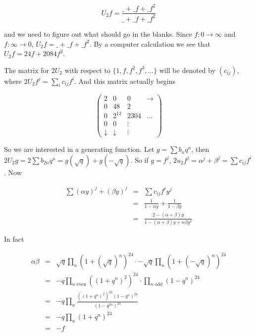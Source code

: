 \documentclass[12pt]{article}
\begin{document}
\[ U_{2}f = \frac{\_ + \_ f + \_ f^{2}}{\_ + \_ f + \_ f^{2}} \]

\noindent and we need to figure out what should go in the blanks.  Since $f:
0 \rightarrow \infty$ and $f: \infty \rightarrow 0$, $U_{2}f = \_ + \_ f +
\_ f^{2}$.  By a computer calculation we see that $U_{2}f = 24f +
2084f^{2}$. 

\medskip

The matrix for $2U_{2}$ with respect to $\{1, f, f^{2}, f^{3}, \ldots \}$
will be denoted by $(c_{ij})$, where $2U_{2}f^{j} = \sum_{i} c_{ij}f^{i}$.
And this matrix actually begins 


\[ \begin{pmatrix} 2 &   0        & 0      & \longrightarrow \\
                0 &   48       & 2      &  \\
                0 & 2^{12}     & 2304   & \dots \\
                0 &   0        & \vdots &  \\
      \downarrow  & \downarrow & \vdots \end{pmatrix} \]     

\medskip

\noindent So we are interested in a generating function.  Let $g = \sum
b_{n}q^{n}$, then $2U_{2}g = 2 \sum b_{2n} q^{n} = g(\sqrt{q}) +
g(-\sqrt{q})$.  So if $g = f^{j}$, $2u_{2}f^{j} = \alpha^{j} + \beta^{j} =
\sum c_{ij}f^{i}$.  Now

\begin{eqnarray*}
\sum (\alpha y)^{j} + (\beta y)^{j} & = & \sum c_{ij}f^{i}y^{j} \\
                                    & = & \frac{1}{1 - \alpha y} +
\frac{1}{1 - \beta y} \\
                                    & = & \frac{2 - (\alpha + \beta)y}{1 -
(\alpha + \beta)y + \alpha \beta y^{2}}
\end{eqnarray*}

\noindent  In fact

\begin{eqnarray*}
\alpha \beta & = & \sqrt{q}\prod_{n} \left( 1 + (\sqrt{q})^{n} \right) ^{24}
\cdot -\sqrt{q}\prod_{n} \left( 1 + (-\sqrt{q})^{n} \right) ^{24} \\
             & = & -q\prod_{n \mbox{ even}} \left( (1 +
q^{n})^{2}\right)^{24} \cdot \prod_{n \mbox{ odd}}(1 - q^{n})^{24} \\
             & = & -q\prod_{n}\frac{\left( (1 + q^{n})^{2} \right)^{24}
\left( 1 - q^{n} \right)^{24}}{\left( 1 - q^{2n} \right) ^{24}} \\
             & = & -q\prod_{n} \left( 1 + q^{n} \right)^{24} \\
             & = & -f
\end{eqnarray*}
\end{document}
